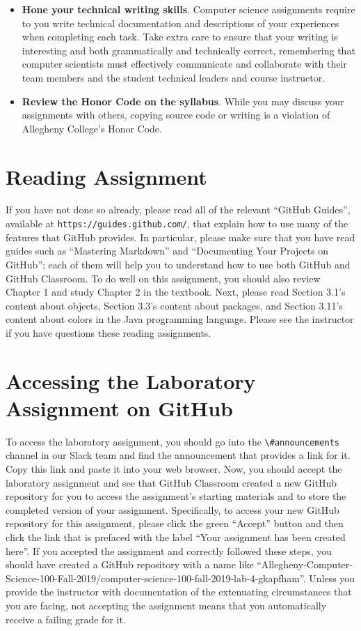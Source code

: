 \documentclass[11pt]{article}
\newcommand{\url}[1]{\lstinline{#1}}
\newcommand{\channel}[1]{\lstinline{#1}}
\begin{document}
\begin{itemize}
\item {\bf Hone your technical writing skills}. Computer science assignments
  require to you write technical documentation and descriptions of your
  experiences when completing each task. Take extra care to ensure that your
  writing is interesting and both grammatically and technically correct,
  remembering that computer scientists must effectively communicate and
  collaborate with their team members and the student technical leaders and
  course instructor.

\item {\bf Review the Honor Code on the syllabus}. While you may discuss your
  assignments with others, copying source code or writing is a violation of
  Allegheny College's Honor Code.

\end{itemize}

\section*{Reading Assignment}

If you have not done so already, please read all of the relevant ``GitHub
Guides'', available at \url{https://guides.github.com/}, that explain how to use
many of the features that GitHub provides. In particular, please make sure that
you have read guides such as ``Mastering Markdown'' and ``Documenting Your
Projects on GitHub''; each of them will help you to understand how to use both
GitHub and GitHub Classroom. To do well on this assignment, you should also
review Chapter 1 and study Chapter 2 in the textbook. Next, please read Section
3.1's content about objects, Section 3.3's content about packages, and Section
3.11's content about colors in the Java programming language.
%
Please see the instructor if you have questions these reading assignments.

\section*{Accessing the Laboratory Assignment on GitHub}

To access the laboratory assignment, you should go into the
\channel{\#announcements} channel in our Slack team and find the announcement
that provides a link for it. Copy this link and paste it into your web browser.
Now, you should accept the laboratory assignment and see that GitHub Classroom
created a new GitHub repository for you to access the assignment's starting
materials and to store the completed version of your assignment. Specifically,
to access your new GitHub repository for this assignment, please click the green
``Accept'' button and then click the link that is prefaced with the label ``Your
assignment has been created here''. If you accepted the assignment and correctly
followed these steps, you should have created a GitHub repository with a name
like
``Allegheny-Computer-Science-100-Fall-2019/computer-science-100-fall-2019-lab-4-gkapfham''.
Unless you provide the instructor with documentation of the extenuating
circumstances that you are facing, not accepting the assignment means that you
automatically receive a failing grade for it.
\end{document}
